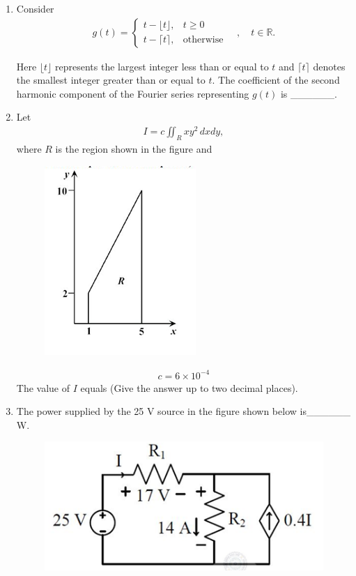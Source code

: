 \documentclass[journal,12pt,onecolumn]{IEEEtran}
\theoremstyle{remark}
\begin{document}
\begin{enumerate}
\item Consider 
\begin{align*}
    g(t) = 
\begin{cases}
t - \lfloor t \rfloor, & t \geq 0 \\
t - \lceil t \rceil, & \text{otherwise}
\end{cases}
\quad , \quad t \in \mathbb{R}.
\end{align*}

Here $\lfloor t \rfloor$ represents the largest integer less than or equal to $t$ and $\lceil t \rceil$ denotes the smallest integer greater than or equal to $t$. The coefficient of the second harmonic component of the Fourier series representing $g(t)$ is ______.  


\item Let 
\begin{align*}
    I = c \iint_R x y^2 \, dxdy ,
\end{align*}
where $R$ is the region shown in the figure and 
\begin{figure}[h!]
    \centering
    \includegraphics[width=0.5\columnwidth]{figs/17.png}
    \caption{}
    \label{fig:placeholder}
\end{figure}
\begin{align*}
    c = 6 \times 10^{-4}
\end{align*}
The value of $I$ equals (Give the answer up to two decimal places).  

\item The power supplied by the 25 V source in the figure shown below is______ W.  

\begin{figure}[h!]
    \centering
    \includegraphics[width=0.5\columnwidth]{figs/18.png}
    \caption{}
    \label{fig:placeholder}
\end{figure}


\end{enumerate}
\end{document}
